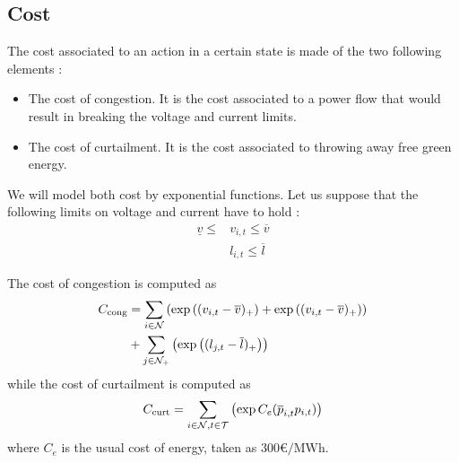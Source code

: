 \subsection{Cost}
The cost associated to an action in a certain state is made of the two following elements :
\begin{itemize}
  \item The cost of congestion. It is the cost associated to a power flow that would result in breaking the voltage and current limits.
  \item The cost of curtailment. It is the cost associated to throwing away free green energy.
\end{itemize}

We will model both cost by exponential functions.
Let us suppose that the following limits on voltage and current have to hold :
\begin{align*}
  \underline{v} \le &v_{i,t} \le \overline{v}\\
  &l_{i,t} \le \overline{l}
\end{align*}

The cost of congestion is computed as
\begin{align*}
  C_{\text{cong}} &= \sum_{i \in \mathcal{N}} \left(\exp{\left((v_{i,t}-\overline{v})_+\right)} + \exp{\left((v_{i,t}-\overline{v})_+\right)}\right)  \\
  &+ \sum_{j \in \mathcal{N}_+} \left(\exp{\left((l_{j,t}-\overline{l})_+\right)} \right)
\end{align*}
while the cost of curtailment is computed as
\[
  C_{\text{curt}} = \sum_{i \in \mathcal{N},t \in \mathcal{T}} \left( \exp{C_e(\overline{p}_{i,t}p_{i,t})} \right)
\]
where $C_e$ is the usual cost of energy, taken as $300\si{\euro\per\mega\watt\hour}$.

